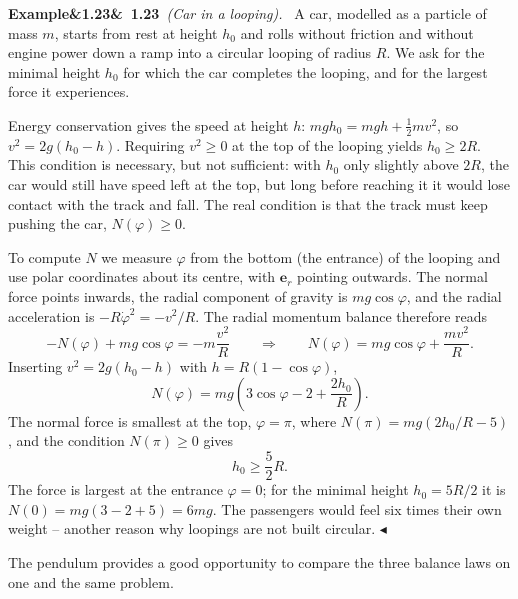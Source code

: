 \documentclass[11pt,a4paper,oneside]{report}
\numberwithin{equation}{chapter}
\newcommand{\vect}[1]{\bm{#1}}
\newcommand{\e}[1]{\vect{e}_{#1}}
\theoremstyle{plain}
\theoremstyle{definition}
\theoremstyle{remark}
\newenvironment{example}[2]{%
  \par\addvspace{\bigskipamount}\noindent
  \textbf{Example\ifx&#1&\else~#1\fi}\ \textit{(#2).}\ \ignorespaces}%
  {\hfill$\blacktriangleleft$\par\addvspace{\bigskipamount}}
\newcommand{\lecture}[2]{\marginpar{\raggedright\footnotesize\textsc{Lecture #1}\\\textit{#2}}}
\begin{document}
\begin{example}{1.23}{Car in a looping}
A car, modelled as a particle of mass $m$, starts from rest at height $h_0$ and rolls without friction and without
engine power down a ramp into a circular looping of radius $R$. We ask for the minimal height $h_0$ for which the
car completes the looping, and for the largest force it experiences.

Energy conservation gives the speed at height $h$: $mgh_0=mgh+\frac12mv^2$, so $v^2=2g(h_0-h)$. Requiring $v^2\ge0$
at the top of the looping yields $h_0\ge2R$. This condition is necessary, but not sufficient: with $h_0$ only
slightly above $2R$, the car would still have speed left at the top, but long before reaching it it would lose
contact with the track and fall. The real condition is that the track must keep pushing the car,
$N(\varphi)\ge0$.

To compute $N$ we measure $\varphi$ from the bottom (the entrance) of the looping and use polar coordinates about its
centre, with $\e r$ pointing outwards. The normal force points inwards, the radial component of gravity is
$mg\cos\varphi$, and the radial acceleration is $-R\dot\varphi^2=-v^2/R$. The radial momentum balance therefore reads
\[
  -N(\varphi)+mg\cos\varphi=-m\frac{v^2}{R}\qquad\Longrightarrow\qquad N(\varphi)=mg\cos\varphi+\frac{mv^2}{R}.
\]
Inserting $v^2=2g(h_0-h)$ with $h=R(1-\cos\varphi)$,
\[
  N(\varphi)=mg\left(3\cos\varphi-2+\frac{2h_0}{R}\right).
\]
The normal force is smallest at the top, $\varphi=\pi$, where $N(\pi)=mg(2h_0/R-5)$, and the condition $N(\pi)\ge0$
gives
\[
  h_0\ge\frac52R .
\]
The force is largest at the entrance $\varphi=0$; for the minimal height $h_0=5R/2$ it is $N(0)=mg(3-2+5)=6mg$. The
passengers would feel six times their own weight -- another reason why loopings are not built circular.
\end{example}

\lecture{5}{30.09.2026}
The pendulum provides a good opportunity to compare the three balance laws on one and the same problem.
\end{document}
